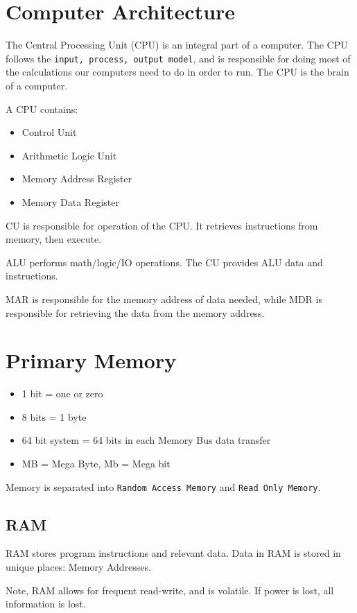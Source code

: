 \documentclass[../notes.tex]{subfiles}
\begin{document}
\section{Computer Architecture}
The Central Processing Unit (CPU) is an integral part of a computer.
The CPU follows the \texttt{input, process, output model}, and is responsible for doing most of the calculations our computers need to do in order to run.
The CPU is the brain of a computer.

A CPU contains:
\begin{itemize}
	\item Control Unit
	\item Arithmetic Logic Unit
	\item Memory Address Register
	\item Memory Data Register
\end{itemize}

CU is responsible for operation of the CPU.
It retrieves instructions from memory, then execute.

ALU performs math/logic/IO operations.
The CU provides ALU data and instructions.

MAR is responsible for the memory address of data needed, while MDR is responsible for retrieving the data from the memory address.

\section{Primary Memory}
\begin{itemize}
	\item 1 bit = one or zero
	\item 8 bits = 1 byte
	\item 64 bit system = 64 bits in each Memory Bus data transfer
	\item MB = Mega Byte, Mb = Mega bit
\end{itemize}

Memory is separated into \texttt{Random Access Memory} and \texttt{Read Only Memory}.

\subsection{RAM}
RAM stores program instructions and relevant data.
Data in RAM is stored in unique places: Memory Addresses.

Note, RAM allows for frequent read-write, and is volatile.
If power is lost, all information is lost.
\end{document}
